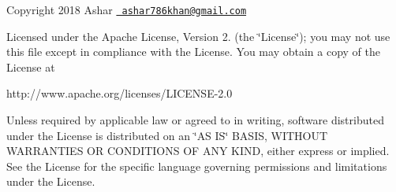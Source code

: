 Copyright 2018 Ashar 
\href{mailto:ashar786khan@gmail.com}{\texttt{ ashar786khan@gmail.\+com}}

Licensed under the Apache License, Version 2. (the \char`\"{}\+License\char`\"{}); you may not use this file except in compliance with the License. You may obtain a copy of the License at \begin{DoxyVerb}http://www.apache.org/licenses/LICENSE-2.0
\end{DoxyVerb}


Unless required by applicable law or agreed to in writing, software distributed under the License is distributed on an \char`\"{}\+A\+S I\+S\char`\"{} B\+A\+S\+IS, W\+I\+T\+H\+O\+UT W\+A\+R\+R\+A\+N\+T\+I\+ES OR C\+O\+N\+D\+I\+T\+I\+O\+NS OF A\+NY K\+I\+ND, either express or implied. See the License for the specific language governing permissions and limitations under the License.